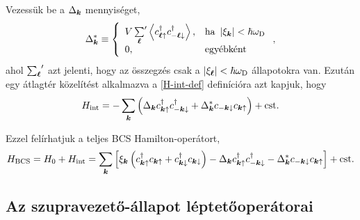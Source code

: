 \documentclass[a4paper,12pt,titlepage]{article}
\newcommand{\KK}{{\vb*{k}}}
\newcommand{\LL}{{\vb*{\ell}}}
\begin{document}
Vezessük be a $\Delta_\KK$ mennyiséget,
\begin{equation}
	\Delta_\KK^* \equiv \left\{ \begin{array}{ll}
	V \, {\sum\limits_\LL}^\prime \expval{c_{\LL \uparrow}^\dagger c_{-\LL \downarrow}^\dagger}, & \text{ha } \left| \xi_\KK \right| < \hbar \omega_\text{D} \\
	0, & \text{egyébként}
	\end{array} \right. ,
\end{equation}
ahol ${\sum_\LL}^\prime$ azt jelenti, hogy az összegzés csak a $\left| \xi_\LL \right| < \hbar \omega_\text{D}$ állapotokra van.  Ezután egy átlagtér közelítést alkalmazva a \eqref{H-int-def} definícióra azt kapjuk, hogy
\begin{equation}
	H_\text{int} = - \sum\limits_\KK \left( \Delta_\KK c_{\KK \uparrow}^\dagger c_{-\KK \downarrow}^\dagger + \Delta_\KK^* c_{-\KK \downarrow} c_{\KK \uparrow} \right) + \text{cst}.
\end{equation}

Ezzel felírhatjuk a teljes BCS Hamilton-operátort,
\begin{equation}
	H_\text{BCS} = H_0 + H_\text{int} = \sum\limits_\KK \left[ \xi_\KK \left( c_{\KK \uparrow}^\dagger c_{\KK \uparrow} + c_{\KK \downarrow}^\dagger c_{\KK \downarrow} \right) - \Delta_\KK c_{\KK \uparrow}^\dagger c_{-\KK \downarrow}^\dagger - \Delta_\KK^* c_{-\KK \downarrow} c_{\KK \uparrow} \right] + \text{cst}.
\end{equation}


\subsection{Az szupravezető-állapot léptetőoperátorai}
\end{document}

